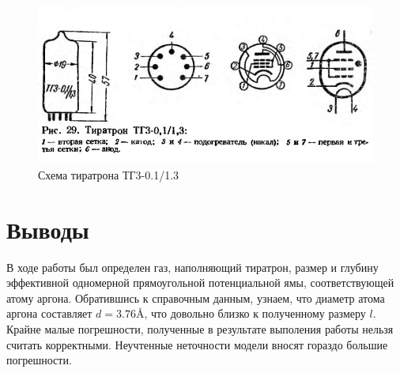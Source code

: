 \documentclass[14pt, a4paper]{report}
\begin{document}
\begin{enumerate}
\begin{figure}[H]
\centering
\includegraphics[scale=0.6]{../images/513-9}
\caption{Схема тиратрона ТГ3-0.1/1.3}
\end{figure}

\end{enumerate}

\section{Выводы}

В ходе работы был определен газ, наполняющий тиратрон, размер и глубину эффективной одномерной прямоугольной потенциальной ямы, соответствующей атому аргона. Обратившись к справочным данным, узнаем, что диаметр атома аргона составляет $d=3.76\si{\angstrom}$, что довольно близко к полученному размеру $l$. Крайне малые погрешности, полученные в результате выполения работы нельзя считать корректными. Неучтенные неточности модели вносят гораздо большие погрешности.
\end{document}
